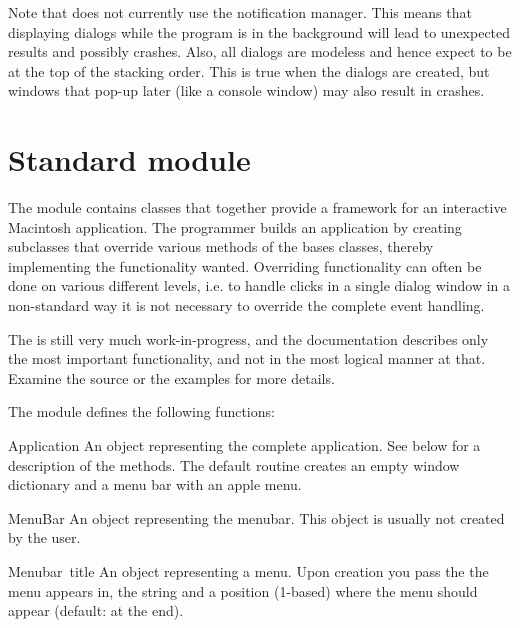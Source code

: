 Note that  does not currently use the notification
manager. This means that displaying dialogs while the program is in
the background will lead to unexpected results and possibly
crashes. Also, all dialogs are modeless and hence expect to be at the
top of the stacking order. This is true when the dialogs are created,
but windows that pop-up later (like a console window) may also result
in crashes.


\section{Standard module }

The  module contains classes that together provide a
framework for an interactive Macintosh application. The programmer
builds an application by creating subclasses that override various
methods of the bases classes, thereby implementing the functionality
wanted. Overriding functionality can often be done on various
different levels, i.e. to handle clicks in a single dialog window in a
non-standard way it is not necessary to override the complete event
handling.

The  is still very much work-in-progress, and the
documentation describes only the most important functionality, and not
in the most logical manner at that. Examine the source or the examples
for more details.

The  module defines the following functions:

\renewcommand{\indexsubitem}{(in module FrameWork)}

\begin{funcdesc}{Application}{}
An object representing the complete application. See below for a
description of the methods. The default  routine
creates an empty window dictionary and a menu bar with an apple menu.
\end{funcdesc}

\begin{funcdesc}{MenuBar}{}
An object representing the menubar. This object is usually not created
by the user.
\end{funcdesc}

\begin{funcdesc}{Menu}{bar\, title}
An object representing a menu. Upon creation you pass the
 the menu appears in, the  string and a
position (1-based)  where the menu should appear (default:
at the end).
\end{funcdesc}

